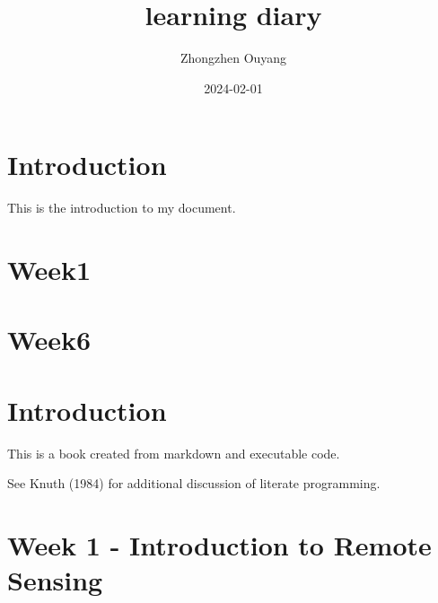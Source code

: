 \documentclass[
  letterpaper,
  DIV=11,
  numbers=noendperiod]{scrreprt}
\title{learning diary}
\author{Zhongzhen Ouyang}
\date{2024-02-01}
\renewcommand*\contentsname{Table of contents}
\newcommand\contentsname{Table of contents}
\begin{document}
\maketitle
\ifdefined\Shaded\renewenvironment{Shaded}{\begin{tcolorbox}[borderline west={3pt}{0pt}{shadecolor}, interior hidden, enhanced, breakable, boxrule=0pt, sharp corners, frame hidden]}{\end{tcolorbox}}\fi

\renewcommand*\contentsname{Table of contents}
{
\hypersetup{linkcolor=}
\setcounter{tocdepth}{2}
\tableofcontents
}

\hypertarget{introduction}{%
\chapter{Introduction}\label{introduction}}

This is the introduction to my document.


\hypertarget{week1}{%
\chapter{Week1}\label{week1}}


\hypertarget{week6}{%
\chapter{Week6}\label{week6}}


\hypertarget{introduction-1}{%
\chapter{Introduction}\label{introduction-1}}

This is a book created from markdown and executable code.

See Knuth (1984) for additional discussion of literate programming.


\hypertarget{week-1---introduction-to-remote-sensing}{%
\chapter{Week 1 - Introduction to Remote
Sensing}\label{week-1---introduction-to-remote-sensing}}
\end{document}
